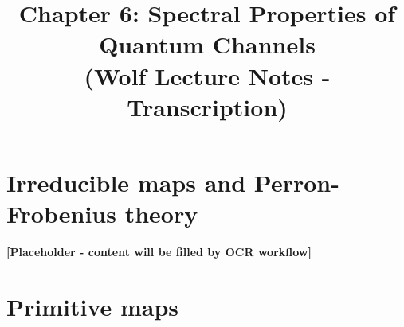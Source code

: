 \documentclass{article}
\title{Chapter 6: Spectral Properties of Quantum Channels \\ {\small (Wolf Lecture Notes - Transcription)}}
\author{}
\date{}
\theoremstyle{plain}
\theoremstyle{definition}
\theoremstyle{remark}
\begin{document}
\maketitle

\tableofcontents

\section{Irreducible maps and Perron-Frobenius theory} \label{sec:irreducible}

%
%
%
%
%
%
%
%

\textbf{[Placeholder - content will be filled by OCR workflow]}

\section{Primitive maps} \label{sec:primitive}

%
%
%
%
%
\end{document}
